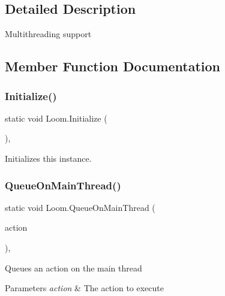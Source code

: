 \subsection{Detailed Description}
Multithreading support 



\subsection{Member Function Documentation}
\mbox{\label{class_loom_aa8179ae2588826a3feb739b2540e710a}} 
\subsubsection{\texorpdfstring{Initialize()}{Initialize()}}
{\footnotesize\ttfamily static void Loom.\+Initialize (\begin{DoxyParamCaption}{ }\end{DoxyParamCaption})\hspace{0.3cm}{\ttfamily [inline]}, {\ttfamily [static]}}



Initializes this instance. 

\mbox{\label{class_loom_a0d38a65c449aacb444a14074f3d62574}} 
\subsubsection{\texorpdfstring{Queue\+On\+Main\+Thread()}{QueueOnMainThread()}\hspace{0.1cm}{\footnotesize\ttfamily [1/2]}}
{\footnotesize\ttfamily static void Loom.\+Queue\+On\+Main\+Thread (\begin{DoxyParamCaption}\item[{Action}]{action }\end{DoxyParamCaption})\hspace{0.3cm}{\ttfamily [inline]}, {\ttfamily [static]}}



Queues an action on the main thread 


\begin{DoxyParams}{Parameters}
{\em action} & The action to execute \\
\hline
\end{DoxyParams}
\mbox{\label{class_loom_a9003659e5b32d18ddb3c9204dcff343f}} 
